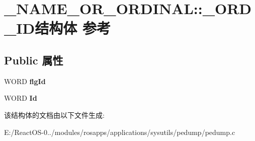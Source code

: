 \hypertarget{struct___n_a_m_e___o_r___o_r_d_i_n_a_l_1_1___o_r_d___i_d}{}\section{\+\_\+\+N\+A\+M\+E\+\_\+\+O\+R\+\_\+\+O\+R\+D\+I\+N\+AL\+:\+:\+\_\+\+O\+R\+D\+\_\+\+I\+D结构体 参考}
\label{struct___n_a_m_e___o_r___o_r_d_i_n_a_l_1_1___o_r_d___i_d}
\subsection*{Public 属性}
\begin{DoxyCompactItemize}
\item 
\mbox{\label{struct___n_a_m_e___o_r___o_r_d_i_n_a_l_1_1___o_r_d___i_d_a7fc4eee2cd34280334386d365c466a94}} 
W\+O\+RD {\bfseries flg\+Id}
\item 
\mbox{\label{struct___n_a_m_e___o_r___o_r_d_i_n_a_l_1_1___o_r_d___i_d_ac7f84b5a43d71f3d1fcbd6cd4fe47e1e}} 
W\+O\+RD {\bfseries Id}
\end{DoxyCompactItemize}


该结构体的文档由以下文件生成\+:\begin{DoxyCompactItemize}
\item 
E\+:/\+React\+O\+S-\/0../modules/rosapps/applications/sysutils/pedump/pedump.\+c\end{DoxyCompactItemize}
